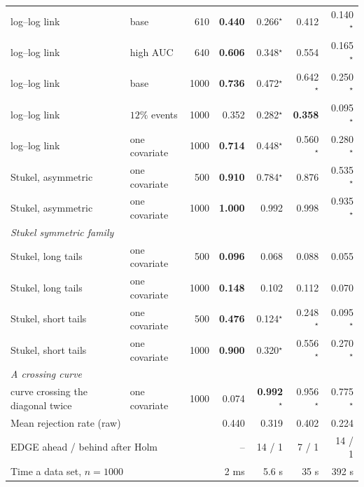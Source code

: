 \begin{table}[htbp]
\begin{tabular}{llrrrrr}
\quad log--log link & base & 610 & \textbf{0.440} & 0.266$^\star$ & 0.412 & 0.140$^\star$ \\
\quad log--log link & high AUC & 640 & \textbf{0.606} & 0.348$^\star$ & 0.554 & 0.165$^\star$ \\
\quad log--log link & base & 1000 & \textbf{0.736} & 0.472$^\star$ & 0.642$^\star$ & 0.250$^\star$ \\
\quad log--log link & $12\%$ events & 1000 & 0.352 & 0.282$^\star$ & \textbf{0.358} & 0.095$^\star$ \\
\quad log--log link & one covariate & 1000 & \textbf{0.714} & 0.448$^\star$ & 0.560$^\star$ & 0.280$^\star$ \\
\quad Stukel, asymmetric & one covariate & 500 & \textbf{0.910} & 0.784$^\star$ & 0.876 & 0.535$^\star$ \\
\quad Stukel, asymmetric & one covariate & 1000 & \textbf{1.000} & 0.992 & 0.998 & 0.935$^\star$ \\
\multicolumn{7}{l}{\emph{Stukel symmetric family}} \\
\quad Stukel, long tails & one covariate & 500 & \textbf{0.096} & 0.068 & 0.088 & 0.055 \\
\quad Stukel, long tails & one covariate & 1000 & \textbf{0.148} & 0.102 & 0.112 & 0.070 \\
\quad Stukel, short tails & one covariate & 500 & \textbf{0.476} & 0.124$^\star$ & 0.248$^\star$ & 0.095$^\star$ \\
\quad Stukel, short tails & one covariate & 1000 & \textbf{0.900} & 0.320$^\star$ & 0.556$^\star$ & 0.270$^\star$ \\
\multicolumn{7}{l}{\emph{A crossing curve}} \\
\quad curve crossing the diagonal twice & one covariate & 1000 & 0.074 & \textbf{0.992}$^\star$ & 0.956$^\star$ & 0.775$^\star$ \\
\hline
\multicolumn{3}{l}{Mean rejection rate (raw)} & 0.440 & 0.319 & 0.402 & 0.224 \\
\multicolumn{3}{l}{EDGE ahead / behind after Holm} & -- & 14 / 1 & 7 / 1 & 14 / 1 \\
\multicolumn{3}{l}{Time a data set, $n=1000$} & 2 ms & 5.6 s & 35 s & 392 s \\
\hline\end{tabular}\end{table}
